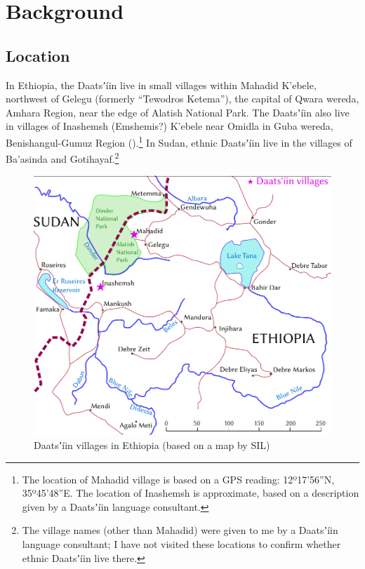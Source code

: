 \documentclass[output=paper]{langsci/langscibook}
\begin{document}
\section{Background}\label{sec:ahlandc:2}

\subsection{Location}\label{sec:ahlandc:2.1}

In Ethiopia, the Daatsʼíin live in small villages within Mahadid K’ebele, northwest of Gelegu (formerly “Tewodros Ketema”), the capital of Qwara wereda, Amhara Region, near the edge of Alatish National Park. The Daatsʼíin also live in villages of Inashemsh (Emshemis?) K’ebele near Omidla in Guba wereda, Benishangul-Gumuz Region ().\footnote{The location of Mahadid village is based on a GPS reading: 12º17'56''N, 35º45'48''E. The location of Inashemsh is approximate, based on a description given by a Daatsʼíin language consultant.} In Sudan, ethnic Daatsʼíin live in the villages of Ba’asinda and Gotihayaf.\footnote{The village names (other than Mahadid) were given to me by a Daatsʼíin language consultant; I have not visited these locations to confirm whether ethnic Daatsʼíin live there. }

 
\begin{figure}
\includegraphics[width=\textwidth]{figures/AhlandCDaatsiin.pdf}
\caption{Daatsʼíin villages in Ethiopia (based on a map by SIL)}
\label{fig:ahlandc:1}
\end{figure}
\end{document}
